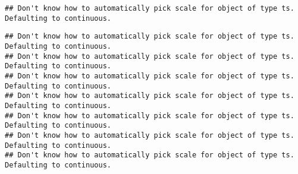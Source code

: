 \documentclass[
]{article}
\newenvironment{Shaded}{\begin{snugshade}}{\end{snugshade}}
\newcommand{\CommentTok}[1]{\textcolor[rgb]{0.56,0.35,0.01}{\textit{#1}}}
\newcommand{\DataTypeTok}[1]{\textcolor[rgb]{0.13,0.29,0.53}{#1}}
\newcommand{\DecValTok}[1]{\textcolor[rgb]{0.00,0.00,0.81}{#1}}
\newcommand{\KeywordTok}[1]{\textcolor[rgb]{0.13,0.29,0.53}{\textbf{#1}}}
\newcommand{\NormalTok}[1]{#1}
\newcommand{\OperatorTok}[1]{\textcolor[rgb]{0.81,0.36,0.00}{\textbf{#1}}}
\newcommand{\StringTok}[1]{\textcolor[rgb]{0.31,0.60,0.02}{#1}}
\begin{document}
\begin{Shaded}
\end{Shaded}

\begin{verbatim}
## Don't know how to automatically pick scale for object of type ts. Defaulting to continuous.
\end{verbatim}

\begin{verbatim}
## Don't know how to automatically pick scale for object of type ts. Defaulting to continuous.
## Don't know how to automatically pick scale for object of type ts. Defaulting to continuous.
## Don't know how to automatically pick scale for object of type ts. Defaulting to continuous.
## Don't know how to automatically pick scale for object of type ts. Defaulting to continuous.
## Don't know how to automatically pick scale for object of type ts. Defaulting to continuous.
## Don't know how to automatically pick scale for object of type ts. Defaulting to continuous.
## Don't know how to automatically pick scale for object of type ts. Defaulting to continuous.
\end{verbatim}
\end{document}
